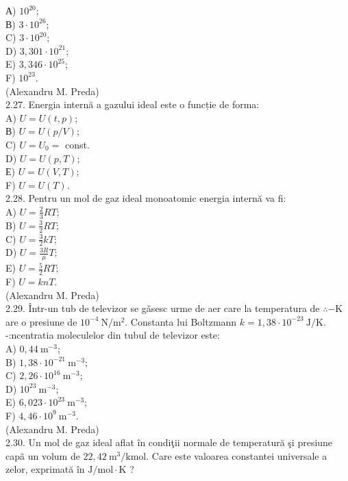 \documentclass[10pt]{article}
\begin{document}
А) $10^{20}$;\\
В) $3 \cdot 10^{26}$;\\
C) $3 \cdot 10^{20}$;\\
D) $3,301 \cdot 10^{21}$;\\
E) $3,346 \cdot 10^{25}$;\\
F) $10^{23}$.\\
(Alexandru M. Preda)\\
2.27. Energia internă a gazului ideal este o funcție de forma:\\
A) $U=U(t, p)$;\\
В) $U=U(p / V)$;\\
C) $U=U_{0}=$ const.\\
D) $U=U(p, T)$;\\
Е) $U=U(V, T)$;\\
F) $U=U(T)$.\\
2.28. Pentru un mol de gaz ideal monoatomic energia internă va fi:\\
A) $U=\frac{2}{3} R T$;\\
B) $U=\frac{3}{2} R T$;\\
C) $U=\frac{3}{2} k T$;\\
D) $U=\frac{3 R}{\mu} T$;\\
E) $U=\frac{5}{2} R T$;\\
F) $U=k n T$.\\
(Alexandru M. Preda)\\
2.29. Într-un tub de televizor se gǎsesc urme de aer care la temperatura de $\therefore-\mathrm{K}$ are o presiune de $10^{-4} \mathrm{~N} / \mathrm{m}^{2}$. Constanta lui Boltzmann $k=1,38 \cdot 10^{-23} \mathrm{~J} / \mathrm{K}$. -:ncentratia moleculelor din tubul de televizor este:\\
A) $0,44 \mathrm{~m}^{-3}$;\\
B) $1,38 \cdot 10^{-21} \mathrm{~m}^{-3}$;\\
C) $2,26 \cdot 10^{16} \mathrm{~m}^{-3}$;\\
D) $10^{23} \mathrm{~m}^{-3}$;\\
E) $6,023 \cdot 10^{23} \mathrm{~m}^{-3}$;\\
F) $4,46 \cdot 10^{9} \mathrm{~m}^{-3}$.\\
(Alexandru M. Preda)\\
2.30. Un mol de gaz ideal aflat în condiţii normale de temperatură şi presiune capã un volum de $22,42 \mathrm{~m}^{3} / \mathrm{kmol}$. Care este valoarea constantei universale a zelor, exprimată în $\mathrm{J} / \mathrm{mol} \cdot \mathrm{K}$ ?\\
\end{document}

